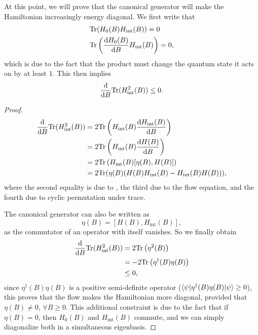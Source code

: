 \documentclass{article}
\begin{document}
At this point, we will prove that the canonical generator will make the Hamiltonian increasingly energy diagonal. We first write that 
\begin{align}
&\mathrm{Tr}(H_0(B)H_{\mathrm{int}}(B))=0\label{eq:trace1}\\
&\mathrm{Tr}\left(\diff{H_0(B)}{B}H_{\mathrm{int}}(B)\right)=0,\label{eq:trace2}
\end{align}
which is due to the fact that the product must change the quantum state it acts on by at least $1$. This then implies 
\begin{equation}
\diff{}{B}\mathrm{Tr}(H_{\mathrm{int}}^2(B))\leq 0.
\end{equation}
\begin{proof}
    \begin{align}
    \diff{}{B}\mathrm{Tr}(H_{\mathrm{int}}^2(B))&=2\mathrm{Tr}\left(H_{\mathrm{int}}(B)\diff{H_{\mathrm{int}}(B)}{B}\right)\\
    &=2\mathrm{Tr}\left(H_{\mathrm{int}}(B)\diff{H(B)}{B}\right)\\
    &=2\mathrm{Tr}\left(H_{\mathrm{int}}(B)[\eta(B),H(B)]\right)\\
    &=2\mathrm{Tr}(\eta(B)(H(B)H_{\mathrm{int}}(B)-H_{\mathrm{int}}(B)H(B))),
    \end{align}
    where the second equality is due to , the third due to the flow equation, and the fourth due to cyclic permutation under trace.

    The canonical generator can also be written as
    \begin{equation}
    \eta(B)=[H(B),H_{\mathrm{int}}(B)],
    \end{equation}
    as the commutator of an operator with itself vanishes. So we finally obtain
    \begin{align}
    \diff{}{B}\mathrm{Tr}(H^2_{\mathrm{int}}(B))&=2\mathrm{Tr}\left(\eta^2(B)\right)\\
    &=-2\mathrm{Tr}\left(\eta^{\dagger}(B)\eta(B)\right)\\
    &\leq 0,
    \end{align}
    since $\eta^{\dagger}(B)\eta(B)$ is a positive semi-definite operator ($\langle\psi|\eta^{\dagger}(B)\eta(B)|\psi\rangle\geq0$), this proves that the flow makes the Hamiltonian more diagonal, provided that $\eta(B)\neq0$, $\forall B\geq0$. This additional constraint is due to the fact that if $\eta(B)=0$, then $H_0(B)$ and $H_{\mathrm{int}}(B)$ commute, and we can simply diagonalize both in a simultaneous eigenbasis.
\end{proof}
\end{document}
